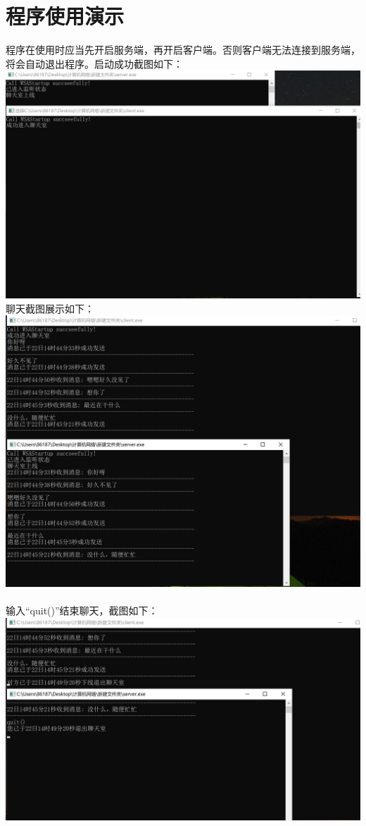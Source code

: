 \documentclass{article}
\begin{document}
\section{程序使用演示}
程序在使用时应当先开启服务端，再开启客户端。否则客户端无法连接到服务端，将会自动退出程序。启动成功截图如下：\\
\includegraphics[scale=0.4]{2.png}\\
\newpage
\noindent 聊天截图展示如下：\\
\includegraphics[scale=0.4]{3.png}\\
\\ 
输入“quit()”结束聊天，截图如下：\\
\includegraphics[scale=0.4]{4.png}
\end{document}
